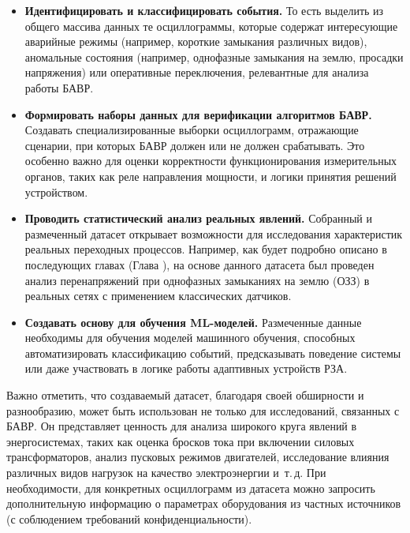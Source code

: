 \begin{itemize}
  \item \textbf{Идентифицировать и классифицировать события.} То есть выделить из общего массива данных те осциллограммы, которые содержат интересующие аварийные режимы (например, короткие замыкания различных видов), аномальные состояния (например, однофазные замыкания на землю, просадки напряжения) или оперативные переключения, релевантные для анализа работы БАВР.
  \item \textbf{Формировать наборы данных для верификации алгоритмов БАВР.} Создавать специализированные выборки осциллограмм, отражающие сценарии, при которых БАВР должен или не должен срабатывать. Это особенно важно для оценки корректности функционирования измерительных органов, таких как реле направления мощности, и логики принятия решений устройством.
  \item \textbf{Проводить статистический анализ реальных явлений.} Собранный и размеченный датасет открывает возможности для исследования характеристик реальных переходных процессов. Например, как будет подробно описано в последующих главах (Глава ), на основе данного датасета был проведен анализ перенапряжений при однофазных замыканиях на землю (ОЗЗ) в реальных сетях с применением классических датчиков.
  \item \textbf{Создавать основу для обучения ML-моделей.} Размеченные данные необходимы для обучения моделей машинного обучения, способных автоматизировать классификацию событий, предсказывать поведение системы или даже участвовать в логике работы адаптивных устройств РЗА.
\end{itemize}

Важно отметить, что создаваемый датасет, благодаря своей обширности и разнообразию, может быть использован не только для исследований, связанных с БАВР. Он представляет ценность для анализа широкого круга явлений в энергосистемах, таких как оценка бросков тока при включении силовых трансформаторов, анализ пусковых режимов двигателей, исследование влияния различных видов нагрузок на качество электроэнергии и~т.\,д. При необходимости, для конкретных осциллограмм из датасета можно запросить дополнительную информацию о параметрах оборудования из частных источников (с соблюдением требований конфиденциальности).

